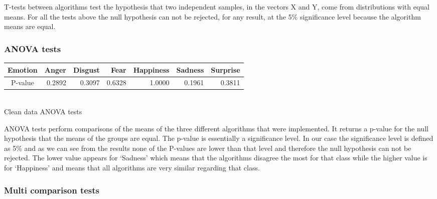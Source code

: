 \documentclass[a4paper,11pt]{article}
\begin{document}
T-tests between algorithms test the hypothesis that two independent samples, in
the vectors X and Y, come from distributions with equal means. For all the
tests above the null hypothesis can not be rejected, for any result, at the 5\%
significance level because the algorithm means are equal. 

\subsubsection{ANOVA tests}

    \begin{center}
    \begin{tabular}{|c||r|r|r|r|r|r|} \hline 
    Emotion & Anger & Disgust & Fear & Happiness & Sadness & Surprise \\ \hline \hline
    P-value & 0.2892 & 0.3097 & 0.6328 & 1.0000 & 0.1961 & 0.3811 \\ \hline
    \end{tabular}\vspace{5pt}\\
    Clean data ANOVA tests
    \end{center}

ANOVA tests perform comparisons of the means of the three different algorithms
that were implemented. It returns a p-value for the null hypothesis that the
means of the groups are equal. The p-value is essentially a significance level.
In our case the significance level is defined as 5\% and as we can see from the
results none of the P-values are lower than that level and therefore the null
hypothesis can not be rejected. The lower value appears for `Sadness' which
means that the algorithms disagree the most for that class while the higher
value is for `Happiness' and means that all algorithms are very similar
regarding that class.

\subsubsection{Multi comparison tests}
\end{document}
